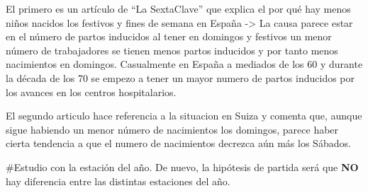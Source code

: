 \documentclass[
]{article}
\begin{document}
El primero es un artículo de ``La SextaClave'' que explica el por qué
hay menos niños nacidos los festivos y fines de semana en España
-\textgreater{} La causa parece estar en el número de partos inducidos
al tener en domingos y festivos un menor número de trabajadores se
tienen menos partos inducidos y por tanto menos nacimientos en domingos.
Casualmente en España a mediados de los 60 y durante la década de los 70
se empezo a tener un mayor numero de partos inducidos por los avances en
los centros hospitalarios.

El segundo articulo hace referencia a la situacion en Suiza y comenta
que, aunque sigue habiendo un menor número de nacimientos los domingos,
parece haber cierta tendencia a que el numero de nacimientos decrezca
aún más los Sábados.

\#Estudio con la estación del año. De nuevo, la hipótesis de partida
será que \textbf{NO} hay diferencia entre las distintas estaciones del
año.
\end{document}

